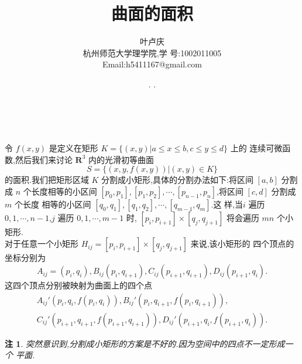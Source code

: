 \documentclass[a4paper, 12pt]{article} %
\makeatletter
\newtheorem*{ddtheorem}{注}
\newenvironment{remark}
{\bigskip\begin{mdframed}[backgroundcolor=gray!40,rightline=false,leftline=false,topline=false,bottomline=false]\begin{ddtheorem}}
    {\end{ddtheorem}\end{mdframed}\bigskip}
\renewcommand{\maketitle}{ %
  \renewcommand\refname{参考文献}
  \newcommand{\D}{\displaystyle}\newcommand{\ri}{\Rightarrow}
  \newcommand{\ds}{\displaystyle} \renewcommand{\ni}{\noindent}
  \newcommand{\pa}{\partial} \newcommand{\Om}{\Omega}
  \newcommand{\om}{\omega} \newcommand{\sik}{\sum_{i=1}^k}
  \newcommand{\vov}{\Vert\omega\Vert} \newcommand{\Umy}{U_{\mu_i,y^i}}
  \newcommand{\lamns}{\lambda_n^{^{\scriptstyle\sigma}}}
  \newcommand{\chiomn}{\chi_{_{\Omega_n}}}
  \newcommand{\ullim}{\underline{\lim}} \newcommand{\bsy}{\boldsymbol}
  \newcommand{\mvb}{\mathversion{bold}} \newcommand{\la}{\lambda}
  \newcommand{\La}{\Lambda} \newcommand{\va}{\varepsilon}
  \newcommand{\be}{\beta} \newcommand{\al}{\alpha}
  \newcommand{\dis}{\displaystyle} \newcommand{\R}{{\mathbb R}}
  \newcommand{\N}{{\mathbb N}} \newcommand{\cF}{{\mathcal F}}
  \newcommand{\gB}{{\mathfrak B}} \newcommand{\eps}{\epsilon}
  \begin{flushright} %
    {\LARGE\@title} %
    
    \vspace{50pt} %
    
    {\large\@author} %
    \\\@date %
    
    \vspace{40pt} %
  \end{flushright}
}
\makeatother
\begin{document}
\title{\textbf{曲面的面积}}
\author{\small{叶卢庆}\\{\small{杭州师范大学理学院,学
      号:1002011005}}\\{\small{Email:h5411167@gmail.com}}} %
\renewcommand{\today}{\number\year. \number\month. \number\day}
\date{\today} %
  
  
  
\maketitle 
令 $f(x,y)$ 是定义在矩形 $K=\{(x,y)|a\leq x\leq b,c\leq y\leq d\}$ 上的
连续可微函数,然后我们来讨论 $\mathbf{R}^3$ 内的光滑初等曲面
$$
S=\{(x,y,f(x,y))|(x,y)\in K\}
$$
的面积.我们把矩形区域 $K$ 分割成小矩形,具体的分割办法如下:将区间
$[a,b]$ 分割成 $n$ 个长度相等的小区间 $[p_0,p_1],[p_1,p_2],\cdots,[p_{n-1},p_n]$,将区间 $[c,d]$ 分割成 $m$ 个长度
相等的小区间 $[q_0,q_1],[q_1,q_2],\cdots,[q_{m-1},q_m]$.这
样,当$i$ 遍历 $0,1,\cdots,n-1$,$j$ 遍历 $0,1,\cdots,m-1$ 时,
$[p_i,p_{i+1}]\times [q_j,q_{j+1}]$ 将会遍历 $mn$ 个小矩形.\\

对于任意一个小矩形 $H_{ij}=[p_i,p_{i+1}]\times [q_j,q_{j+1}]$ 来说,该小矩形的
四个顶点的坐标分别为
$$
A_{ij}=(p_i,q_i),B_{ij}(p_i,q_{i+1}),C_{ij}(p_{i+1},q_{i+1}),D_{ij}(p_{i+1},q_i).
$$
这四个顶点分别被映射为曲面上的四个点
\begin{align*}
A_{ij}'(p_i,q_i,f(p_i,q_i)),B_{ij}'(p_i,q_{i+1},f(p_i,q_{i+1})),\\C_{ij}'(p_{i+1},q_{i+1},f(p_{i+1},q_{i+1})),D_{ij}'(p_{i+1},q_i,f(p_{i+1},q_i)).
\end{align*}
\begin{remark}
  突然意识到,分割成小矩形的方案是不好的.因为空间中的四点不一定形成一个
  平面.
\end{remark}
  

  

  
\end{document}
